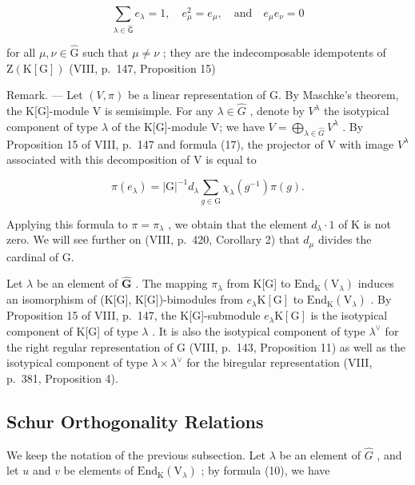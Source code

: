 \[
\sum_ {\lambda \in \widehat {\mathsf {G}}} e _ {\lambda} = 1, \quad e _ {\mu} ^ {2} = e _ {\mu}, \quad \mathrm{and} \quad e _ {\mu} e _ {\nu} = 0\tag{18}
\]

for all \(\mu, \nu \in \widehat{\mathrm{G}}\) such that \(\mu \neq \nu\) ; they are the indecomposable idempotents of \(\mathrm{Z}(\mathrm{K}[\mathrm{G}])\) (VIII, p.~147, Proposition 15)

Remark. --- Let \((V, \pi)\) be a linear representation of G. By Maschke's theorem, the K{[}G{]}-module V is semisimple. For any \(\lambda \in \widehat{G}\) , denote by \(V^{\lambda}\) the isotypical component of type \(\lambda\) of the K{[}G{]}-module V; we have \(V = \bigoplus_{\lambda \in \widehat{G}} V^{\lambda}\) . By Proposition 15 of VIII, p.~147 and formula (17), the projector of V with image \(V^{\lambda}\) associated with this decomposition of V is equal to

\[
\pi (e _ {\lambda}) = | \mathrm{G} | ^ {- 1} d _ {\lambda} \sum_ {g \in \mathrm{G}} \chi_ {\lambda} (g ^ {- 1}) \pi (g).\tag{19}
\]

Applying this formula to \(\pi = \pi_{\lambda}\) , we obtain that the element \(d_{\lambda} \cdot 1\) of K is not zero. We will see further on (VIII, p.~420, Corollary 2) that \(d_{\mu}\) divides the cardinal of G.

Let \(\lambda\) be an element of \(\widehat{\mathbf{G}}\) . The mapping \(\pi_{\lambda}\) from K{[}G{]} to \(\mathrm{End}_{\mathrm{K}}(\mathrm{V}_{\lambda})\) induces an isomorphism of (K{[}G{]}, K{[}G{]})-bimodules from \(e_{\lambda}\mathrm{K}[\mathrm{G}]\) to \(\mathrm{End}_{\mathrm{K}}(\mathrm{V}_{\lambda})\) . By Proposition 15 of VIII, p.~147, the K{[}G{]}-submodule \(e_{\lambda}\mathrm{K}[\mathrm{G}]\) is the isotypical component of K{[}G{]} of type \(\lambda\) . It is also the isotypical component of type \(\lambda^{\vee}\) for the right regular representation of G (VIII, p.~143, Proposition 11) as well as the isotypical component of type \(\lambda \times \lambda^{\vee}\) for the biregular representation (VIII, p.~381, Proposition 4).

\subsection{Schur Orthogonality Relations}

We keep the notation of the previous subsection. Let \(\lambda\) be an element of \(\widehat{G}\) , and let \(u\) and \(v\) be elements of \(\mathrm{End}_{\mathrm{K}}(\mathrm{V}_{\lambda})\) ; by formula (10), we have

